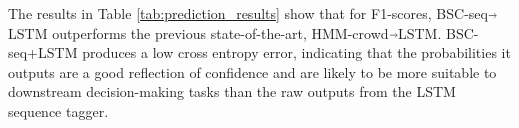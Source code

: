 The results in Table \ref{tab:prediction_results} show that for F1-scores, BSC-seq$\Arrow{.2cm}$LSTM 
outperforms 
the previous state-of-the-art, HMM-crowd$\Arrow{.2cm}$LSTM.
BSC-seq+LSTM produces a low cross entropy error, 
indicating that the probabilities it outputs are a good reflection of confidence and
are likely to be more suitable to downstream decision-making tasks than the raw outputs
from the LSTM sequence tagger.  
